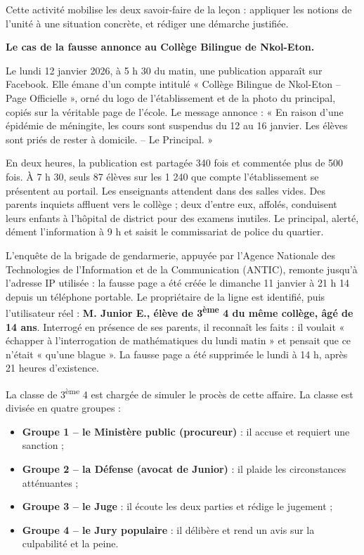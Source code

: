 \documentclass[11pt]{article}
\newcounter{popsec}
\newcounter{popsub}
\newcommand{\courssub}[1]{%
  \stepcounter{popsub}%
  \par\vspace{9pt}\noindent{\popxbold\fontsize{11.5}{13}\selectfont\color{popink}{\color{poporange}\thepopsec.\thepopsub}\hspace{6pt}#1}\par\nopagebreak\vspace{4pt}
}
\begin{document}
Cette activité mobilise les deux savoir-faire de la leçon : appliquer les notions de l'unité à une situation concrète, et rédiger une démarche justifiée.

\courssub{Situation}

\textbf{Le cas de la fausse annonce au Collège Bilingue de Nkol-Eton.}

Le lundi 12 janvier 2026, à 5 h 30 du matin, une publication apparaît sur Facebook. Elle émane d'un compte intitulé « Collège Bilingue de Nkol-Eton -- Page Officielle », orné du logo de l'établissement et de la photo du principal, copiés sur la véritable page de l'école. Le message annonce : « En raison d'une épidémie de méningite, les cours sont suspendus du 12 au 16 janvier. Les élèves sont priés de rester à domicile. -- Le Principal. »

En deux heures, la publication est partagée 340 fois et commentée plus de 500 fois. À 7 h 30, seuls 87 élèves sur les 1 240 que compte l'établissement se présentent au portail. Les enseignants attendent dans des salles vides. Des parents inquiets affluent vers le collège ; deux d'entre eux, affolés, conduisent leurs enfants à l'hôpital de district pour des examens inutiles. Le principal, alerté, dément l'information à 9 h et saisit le commissariat de police du quartier.

L'enquête de la brigade de gendarmerie, appuyée par l'Agence Nationale des Technologies de l'Information et de la Communication (ANTIC), remonte jusqu'à l'adresse IP utilisée : la fausse page a été créée le dimanche 11 janvier à 21 h 14 depuis un téléphone portable. Le propriétaire de la ligne est identifié, puis l'utilisateur réel : \textbf{M. Junior E., élève de 3\textsuperscript{ème} 4 du même collège, âgé de 14 ans}. Interrogé en présence de ses parents, il reconnaît les faits : il voulait « échapper à l'interrogation de mathématiques du lundi matin » et pensait que ce n'était « qu'une blague ». La fausse page a été supprimée le lundi à 14 h, après 21 heures d'existence.

La classe de 3\textsuperscript{ème} 4 est chargée de simuler le procès de cette affaire. La classe est divisée en quatre groupes :

\begin{itemize}
\item \textbf{Groupe 1 -- le Ministère public (procureur)} : il accuse et requiert une sanction ;
\item \textbf{Groupe 2 -- la Défense (avocat de Junior)} : il plaide les circonstances atténuantes ;
\item \textbf{Groupe 3 -- le Juge} : il écoute les deux parties et rédige le jugement ;
\item \textbf{Groupe 4 -- le Jury populaire} : il délibère et rend un avis sur la culpabilité et la peine.
\end{itemize}
\end{document}
